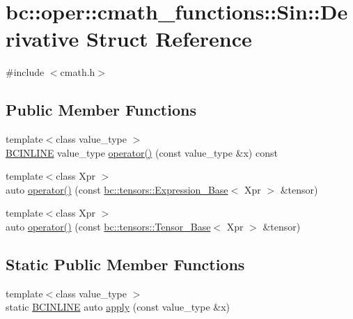 \hypertarget{structbc_1_1oper_1_1cmath__functions_1_1Sin_1_1Derivative}{}\section{bc\+:\+:oper\+:\+:cmath\+\_\+functions\+:\+:Sin\+:\+:Derivative Struct Reference}
\label{structbc_1_1oper_1_1cmath__functions_1_1Sin_1_1Derivative}


{\ttfamily \#include $<$cmath.\+h$>$}

\subsection*{Public Member Functions}
\begin{DoxyCompactItemize}
\item 
{\footnotesize template$<$class value\+\_\+type $>$ }\\\hyperlink{common_8h_a6699e8b0449da5c0fafb878e59c1d4b1}{B\+C\+I\+N\+L\+I\+NE} value\+\_\+type \hyperlink{structbc_1_1oper_1_1cmath__functions_1_1Sin_1_1Derivative_aad90d5dfce5dd00fc12d850005537091}{operator()} (const value\+\_\+type \&x) const
\item 
{\footnotesize template$<$class Xpr $>$ }\\auto \hyperlink{structbc_1_1oper_1_1cmath__functions_1_1Sin_1_1Derivative_ab6f246984f62b00caa5d481aafd155af}{operator()} (const \hyperlink{classbc_1_1tensors_1_1Expression__Base}{bc\+::tensors\+::\+Expression\+\_\+\+Base}$<$ Xpr $>$ \&tensor)
\item 
{\footnotesize template$<$class Xpr $>$ }\\auto \hyperlink{structbc_1_1oper_1_1cmath__functions_1_1Sin_1_1Derivative_a1f798d963a9dd7e85e9042e4af763034}{operator()} (const \hyperlink{classbc_1_1tensors_1_1Tensor__Base}{bc\+::tensors\+::\+Tensor\+\_\+\+Base}$<$ Xpr $>$ \&tensor)
\end{DoxyCompactItemize}
\subsection*{Static Public Member Functions}
\begin{DoxyCompactItemize}
\item 
{\footnotesize template$<$class value\+\_\+type $>$ }\\static \hyperlink{common_8h_a6699e8b0449da5c0fafb878e59c1d4b1}{B\+C\+I\+N\+L\+I\+NE} auto \hyperlink{structbc_1_1oper_1_1cmath__functions_1_1Sin_1_1Derivative_a589132c61f201310bb97096779e8c9aa}{apply} (const value\+\_\+type \&x)
\end{DoxyCompactItemize}


